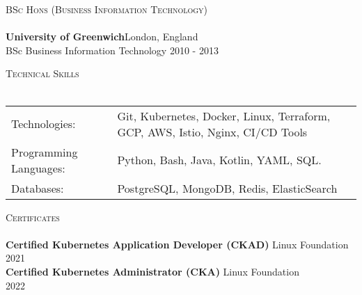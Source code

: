 \documentclass[a4paper]{article}
\newcommand{\lineunder} {
    \vspace*{-8pt} \\
    \hspace*{-18pt} \hrulefill \\
}
\newcommand{\header} [1] {
    {\hspace*{-18pt}\vspace*{6pt} \textsc{#1}}
    \vspace*{-6pt} \lineunder
}
\begin{document}
\header{BSc Hons (Business Information Technology)}
\textbf{University of Greenwich}\hfill London, England\\
BSc Business Information Technology \hfill 2010 - 2013\\
\vspace{2mm}

\header{Technical Skills}
\begin{tabular}{ l l }
	Technologies:          & Git, Kubernetes, Docker, Linux, Terraform, GCP, AWS, Istio, Nginx, CI/CD Tools \\
	Programming Languages: & Python, Bash, Java, Kotlin, YAML, SQL.                                         \\
	Databases:             & PostgreSQL, MongoDB, Redis, ElasticSearch                                      \\
\end{tabular}
\vspace{2mm}

\header{Certificates}
\textbf{Certified Kubernetes Application Developer (CKAD)} \hfill Linux Foundation\\
\hfill 2021\\
\vspace*{2mm}
\textbf{Certified Kubernetes Administrator (CKA)} \hfill Linux Foundation\\
\hfill 2022\\
\vspace*{2mm}



\ 
\end{document}
